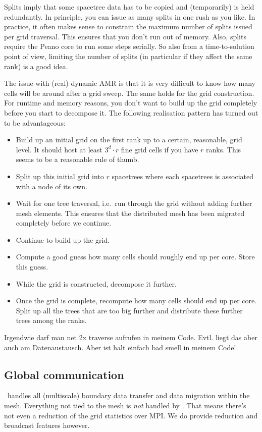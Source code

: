 \begin{remark}
 Splits imply that some spacetree data has to be copied and (temporarily) is
 held redundantly. In principle, you can issue as many splits in one rush as you
 like. In practice, it often makes sense to constrain the maximum number of
 splits issued per grid traversal. This ensures that you don't run out of
 memory. Also, splits require the Peano core to run some steps serially. 
 So also from a time-to-solution point of view, limiting the number of splits
 (in particular if they affect the same rank) is a good idea.
\end{remark}



The issue with (real) dynamic AMR is that it is very difficult to know how many
cells will be around after a grid sweep.
The same holds for the grid construction.
For runtime and memory reasons, you don't want to build up the grid completely
before you start to decompose it.
The following realisation pattern has turned out to be advantageous:
\begin{itemize}
  \item Build up an initial grid on the first rank up to a certain, reasonable,
  grid level. It should host at least $3^d \cdot r$ fine grid cells if you have
  $r$ ranks. This seems to be a reasonable rule of thumb.
  \item Split up this initial grid into $r$ spacetrees where each spacetrees is
  associated with a node of its own.
  \item Wait for one tree traversal, i.e.~run through the grid without adding
  further mesh elements. This ensures that the distributed mesh has been
  migrated completely before we continue.
  \item Continue to build up the grid.
  \item Compute a good guess how many cells should roughly end up per core.
  Store this guess.
  \item While the grid is constructed, decompose it further.
  \item Once the grid is complete, recompute how many cells should end up per
  core. Split up all the trees that are too big further and distribute these
  further trees among the ranks.
\end{itemize}



\begin{remark}
Irgendwie darf man net 2x traverse aufrufen in meinem Code. Evtl. liegt das aber
auch am Datenaustausch. Aber ist halt einfach bad smell in meinem Code!
\end{remark}

 

\subsection{Global communication}

\Peano\ handles all (multiscale) boundary data transfer and data migration
within the mesh.
Everything not tied to the mesh is \emph{not} handled by \Peano.
That means there's not even a reduction of the grid statistics over MPI.
We do provide reduction and broadcast features however. 

 